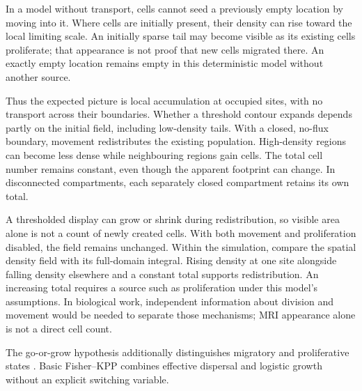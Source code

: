 \biomedicalanswer
{}
In a model without transport, cells cannot seed a previously empty location by moving into it. Where cells are initially present, their density can rise toward the local limiting scale. An initially sparse tail may become visible as its existing cells proliferate; that appearance is not proof that new cells migrated there. An exactly empty location remains empty in this deterministic model without another source.

Thus the expected picture is local accumulation at occupied sites, with no transport across their boundaries. Whether a threshold contour expands depends partly on the initial field, including low-density tails.
With a closed, no-flux boundary, movement redistributes the existing population. High-density regions can become less dense while neighbouring regions gain cells. The total cell number remains constant, even though the apparent footprint can change. In disconnected compartments, each separately closed compartment retains its own total.

A thresholded display can grow or shrink during redistribution, so visible area alone is not a count of newly created cells. With both movement and proliferation disabled, the field remains unchanged.
Within the simulation, compare the spatial density field with its full-domain integral. Rising density at one site alongside falling density elsewhere and a constant total supports redistribution. An increasing total requires a source such as proliferation under this model's assumptions. In biological work, independent information about division and movement would be needed to separate those mechanisms; MRI appearance alone is not a direct cell count.

The go-or-grow hypothesis additionally distinguishes migratory and proliferative states \citep{hatzikirou2012}. Basic Fisher--KPP combines effective dispersal and logistic growth without an explicit switching variable.

